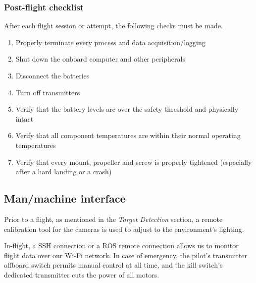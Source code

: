 \subsubsection*{Post-flight checklist}

After each flight session or attempt, the following checks must be made.

\vspace{-0.75cm}
\begin{enumerate} \itemsep -5pt
	\item Properly terminate every process and data acquisition/logging
	\item Shut down the onboard computer and other peripherals
	\item Disconnect the batteries
	\item Turn off transmitters
	\item Verify that the battery levels are over the safety threshold and physically intact
	\item Verify that all component temperatures are within their normal operating temperatures
	\item Verify that every mount, propeller and screw is properly tightened (especially after a hard landing or a crash)
\end{enumerate}

\subsection*{Man/machine interface} \label{subsec:op-interface}

Prior to a flight, as mentioned in the \textit{Target Detection} section, a remote calibration tool for the cameras is used to adjust to the environment’s lighting.

In-flight, a SSH connection or a ROS remote connection allows us to monitor flight data over our Wi-Fi network. In case of emergency, the pilot’s transmitter offboard switch permits manual control at all time, and the kill switch’s dedicated transmitter cuts the power of all motors.
